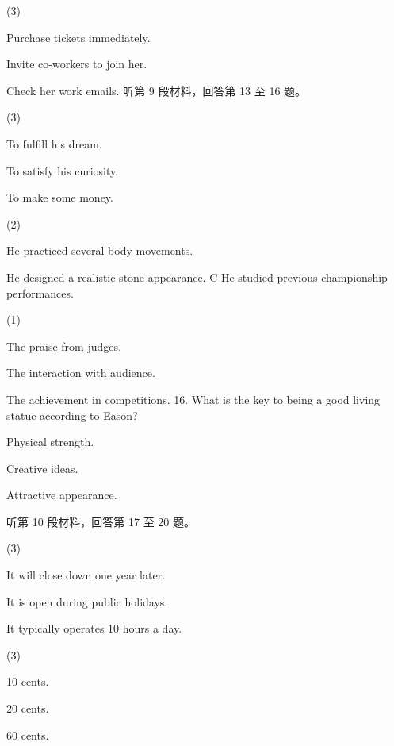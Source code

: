\documentclass{英语试卷}
\begin{document}
\begin{choices}(3)
  \item Purchase tickets immediately.
  \item Invite co-workers to join her.
  \item Check her work emails. 听第 9 段材料，回答第 13 至 16 题。
\end{choices}
\begin{choices}(3)
  \item To fulfill his dream.
  \item To satisfy his curiosity.
  \item To make some money.
\end{choices}
\begin{choices}(2)
  \item He practiced several body movements.
  \item He designed a realistic stone appearance. C He studied previous championship performances.
\end{choices}
\begin{choices}(1)
  \item The praise from judges.
  \item The interaction with audience.
  \item The achievement in competitions. 16. What is the key to being a good living statue according to Eason?
  \item Physical strength.
  \item Creative ideas.
  \item Attractive appearance.
\end{choices}
\par 听第 10 段材料，回答第 17 至 20 题。\par
{}
\begin{choices}(3)
  \item It will close down one year later.
  \item It is open during public holidays.
  \item It typically operates 10 hours a day.
\end{choices}
\begin{choices}(3)
  \item 10 cents.
  \item 20 cents.
  \item 60 cents.
\end{choices}
\end{document}
